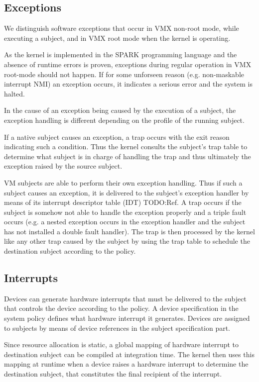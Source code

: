 \subsection{Exceptions}
We distinguish software exceptions that occur in VMX non-root mode, while
executing a subject, and in VMX root mode when the kernel is operating.

As the kernel is implemented in the SPARK programming language and the absence
of runtime errors is proven, exceptions during regular operation in VMX
root-mode should not happen. If for some unforseen reason (e.g. non-maskable
interrupt NMI) an exception occurs, it indicates a serious error and the system
is halted.

In the cause of an exception being caused by the execution of a subject, the
exception handling is different depending on the profile of the running subject.

If a native subject causes an exception, a trap occurs with the exit reason
indicating such a condition. Thus the kernel consults the subject's trap table
to determine what subject is in charge of handling the trap and thus ultimately
the exception raised by the source subject.

VM subjects are able to perform their own exception handling. Thus if such a
subject causes an exception, it is delivered to the subject's exception handler
by means of its interrupt descriptor table (IDT) TODO:Ref. A trap occurs if the
subject is somehow not able to handle the exception properly and a triple fault
occurs (e.g. a nested exception occurs in the exception handler and the subject
has not installed a double fault handler).
The trap is then processed by the kernel like any other trap caused by the
subject by using the trap table to schedule the destination subject according to
the policy.

\subsection{Interrupts}
Devices can generate hardware interrupts that must be delivered to the subject
that controls the device according to the policy. A device specification in the
system policy defines what hardware interrupt it generates. Devices are assigned
to subjects by means of device references in the subject specification part.

Since resource allocation is static, a global mapping of hardware interrupt to
destination subject can be compiled at integration time. The kernel then uses
this mapping at runtime when a device raises a hardware interrupt to determine
the destination subject, that constitutes the final recipient of the interrupt.

